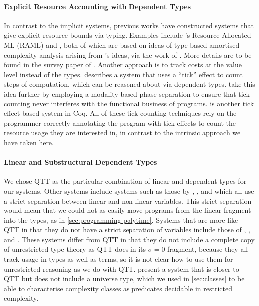 \documentclass[acmsmall,screen]{acmart}
\begin{document}
\paragraph{Explicit Resource Accounting with Dependent Types} In
contrast to the implicit systems, previous works have constructed
systems that give explicit resource bounds via typing. Examples
include \citet{HoffmannDW17}'s Resource Allocated ML (RAML) and
\citet{RajaniG0021}, both of which are based on ideas of type-based
amortised complexity analysis arising from \cite{hofmann99lfpl}'s
ideas, via the work of \citet{HofmannJ03}. More details are to be
found in the survey paper of \citet{HoffmannJ22}. Another approach is
to track costs at the value level instead of the
types. \citet{Danielsson08} describes a system that uses a ``tick''
effect to count steps of computation, which can be reasoned about via
dependent types. \citet{NiuSGH22} take this idea further by employing
a modality-based phase separation to ensure that tick counting never
interferes with the functional business of
programs. \citet{McCarthyFNFF16} is another tick effect based system
in Coq. All of these tick-counting techniques rely on the programmer
correctly annotating the program with tick effects to count the
resource usage they are interested in, in contrast to the intrinsic
approach we have taken here.

\paragraph{Linear and Substructural Dependent Types} We chose QTT as
the particular combination of linear and dependent types for our
systems. Other systems include systems such as those by
\citet{CervesatoP02}, \citet{KrishnaswamiPB15}, and \citet{Vakar14}
which all use a strict separation between linear and non-linear
variables. This strict separation would mean that we could not as
easily move programs from the linear fragment into the types, as in
\autoref{sec:programming-polytime}. Systems that are more like QTT in
that they do not have a strict separation of variables include those
of \citet{MoonEO21}, \citet{ChoudhuryEEW21}, and \citet{Abel18}. These
systems differ from QTT in that they do not include a complete copy of
unrestricted type theory as QTT does in its $\sigma = 0$ fragment,
because they all track usage in types as well as terms, so it is not
clear how to use them for unrestricted reasoning as we do with
QTT. \citet{FuKS22} present a system that is closer to QTT but does
not include a universe type, which we used in \autoref{sec:classes} to
be able to characterise complexity classes as predicates decidable in
restricted complexity.
\end{document}
